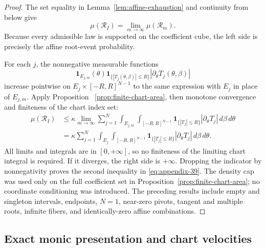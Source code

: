 \begin{proof}
The set equality in Lemma~\ref{lem:affine-exhaustion} and continuity from
below \citep{bogachev2007measure} give
\begin{equation}
\mu(\mathcal R_I)=\lim_{m\to\infty}\mu(\mathcal R_m).
\label{eq:appendix-40}
\end{equation}
Because every admissible law is supported on the coefficient cube, the left
side is precisely the affine root-event probability.

For each $j$, the nonnegative measurable functions
\[
\mathbf1_{E_{j,m}}(\theta)
\mathbf1_{\{|T_j(\theta,\beta)|\leq R\}}
|\partial_\theta T_j(\theta,\beta)|
\]
increase pointwise on $E_j\times[-R,R]^{N-1}$ to the same expression with
$E_j$ in place of $E_{j,m}$.  Apply Proposition
~\ref{prop:finite-chart-area}, then monotone convergence
\citep{bogachev2007measure} and finiteness of the chart index set:
\begin{equation}
\begin{aligned}
\mu(\mathcal R_I)
&\leq\kappa\lim_{m\to\infty}\sum_{j=1}^N
\int_{E_{j,m}}\int_{[-R,R]^{N-1}}
\mathbf1_{\{|T_j|\leq R\}}|\partial_\theta T_j|
\,d\beta\,d\theta\\
&=\kappa\sum_{j=1}^N
\int_{E_j}\int_{[-R,R]^{N-1}}
\mathbf1_{\{|T_j|\leq R\}}|\partial_\theta T_j|
\,d\beta\,d\theta.
\end{aligned}
\label{eq:appendix-41}
\end{equation}
All limits and integrals are in $[0,+\infty]$, so no finiteness of the
limiting chart integral is required.  If it diverges, the right side is
$+\infty$.  Dropping the indicator by nonnegativity proves the second
inequality in \eqref{eq:appendix-39}.  The density cap was used only on the full coefficient
set in Proposition~\ref{prop:finite-chart-area}; no coordinate conditioning
was introduced.  The preceding results include empty and singleton
intervals, endpoints, $N=1$, near-zero pivots, tangent and multiple roots,
infinite fibers, and identically-zero affine combinations.
\end{proof}

\subsection{Exact monic presentation and chart velocities}
\label{app:monic-charts}

